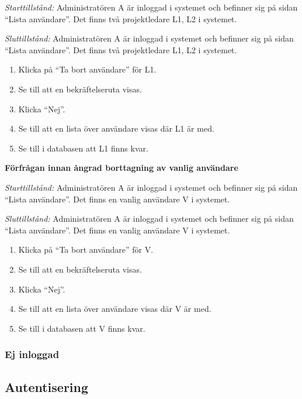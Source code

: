 \documentclass[a4paper]{article}
\begin{document}
\begin{FT}
\emph{Starttillstånd:} Administratören A är inloggad i systemet och befinner sig på sidan ``Lista användare''. Det finns två projektledare L1, L2 i systemet.

\emph{Sluttillstånd:} Administratören A är inloggad i systemet och befinner sig på sidan ``Lista användare''. Det finns två projektledare L1, L2 i systemet.

\begin{enumerate}
\item Klicka på ``Ta bort användare'' för L1.
\item Se till att en bekräftelseruta visas.
\item Klicka ``Nej''.
\item Se till att en lista över användare visas där L1 är med.
\item Se till i databasen att L1 finns kvar.
\end{enumerate}

\item \textbf{Förfrågan innan ångrad borttagning av vanlig användare}

\emph{Starttillstånd:} Administratören A är inloggad i systemet och befinner sig på sidan ``Lista användare''. Det finns en vanlig användare V i systemet.

\emph{Sluttillstånd:} Administratören A är inloggad i systemet och befinner sig på sidan ``Lista användare''. Det finns en vanlig användare V i systemet.

\begin{enumerate}
\item Klicka på ``Ta bort användare'' för V.
\item Se till att en bekräftelseruta visas.
\item Klicka ``Nej''.
\item Se till att en lista över användare visas där V är med.
\item Se till i databasen att V finns kvar.
\end{enumerate}
\end{FT}

\subsubsection{Ej inloggad}



\subsection{Autentisering}
\end{document}
